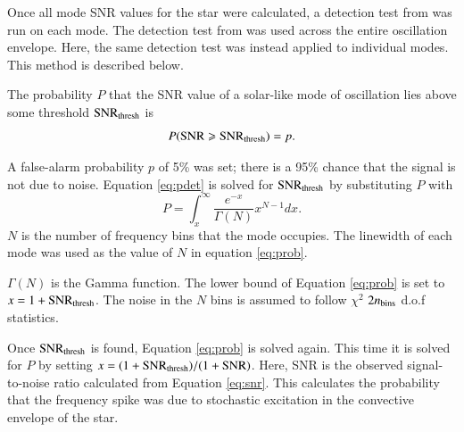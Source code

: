 \documentclass[a4paper,fleqn,usenatbib,useAMS]{mnras}
\begin{document}
Once all mode SNR values for the star were calculated, a detection test from \citet{chaplin_predicting_2011} was run on each mode. The detection test from \citet{chaplin_predicting_2011} was used across the entire oscillation envelope. Here, the same detection test was instead applied to individual modes. This method is described below.

The probability $P$ that the SNR value of a solar-like mode of oscillation lies above some threshold ${\rm SNR_{thresh}}$ is
\begin{equation}
\label{eq:pdet}
{P \rm ({ SNR \geq SNR_{thresh}})} =  p .
\end{equation}

A false-alarm probability $p$ of 5\% was set; there is a 95\% chance that the signal is not due to noise. Equation \ref{eq:pdet} is solved for $\rm SNR_{thresh}$ by substituting $P$ with
\begin{equation}
\label{eq:prob}
P = \int_{x}^{\infty} \frac{e^{-x}}{\Gamma(N)} x^{N-1} dx .
\end{equation}
$N$ is the number of frequency bins that the mode occupies. The linewidth of each mode was used as the value of $N$ in equation \ref{eq:prob}.

$\Gamma(N)$ is the Gamma function. The lower bound of Equation \ref{eq:prob} is set to $x=1+{\rm SNR_{thresh}}$. The noise in the $N$ bins is assumed to follow $\chi^{2}$ $2n_{\rm bins}$ d.o.f statistics. 

Once $\rm SNR_{thresh}$ is found, Equation \ref{eq:prob} is solved again. This time it is solved for $P$ by setting $x=(1+{\rm SNR_{thresh}})/(1+{\rm SNR})$. Here, SNR is the observed signal-to-noise ratio calculated from Equation \ref{eq:snr}. This calculates the probability that the frequency spike was due to stochastic excitation in the convective envelope of the star.
\end{document}
